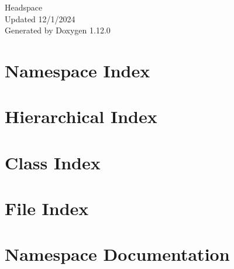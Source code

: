 \documentclass[twoside]{book}
\newcommand{\+}{\discretionary{\mbox{\scriptsize$\hookleftarrow$}}{}{}}
\newcommand{\clearemptydoublepage}{%
    \newpage{\pagestyle{empty}\cleardoublepage}%
  }
\begin{document}
  \raggedbottom
    \hypersetup{pageanchor=false,
                bookmarksnumbered=true,
                pdfencoding=unicode
               }
  \begin{titlepage}
  \vspace*{7cm}
  \begin{center}%
  {\Large Headspace}\\
  [1ex]\large Updated 12/1/2024 \\
  \vspace*{1cm}
  {\large Generated by Doxygen 1.12.0}\\
  \end{center}
  \end{titlepage}
  \clearemptydoublepage
  \tableofcontents
  \clearemptydoublepage
  \hypersetup{pageanchor=true}
\chapter{Namespace Index}

\chapter{Hierarchical Index}

\chapter{Class Index}

\chapter{File Index}

\chapter{Namespace Documentation}























\end{document}
